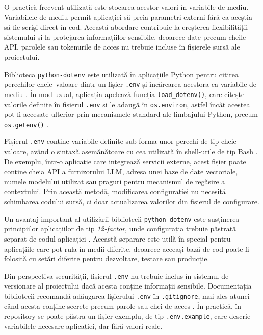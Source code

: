 \documentclass[12pt, a4paper, oneside, romanian]{teza-upb}
\begin{document}
O practică frecvent utilizată este stocarea acestor valori în variabile de mediu. Variabilele de mediu permit aplicației să preia parametri externi fără ca aceștia să fie scriși direct în cod. Această abordare contribuie la creșterea flexibilității sistemului și la protejarea informațiilor sensibile, deoarece date precum cheile API, parolele sau tokenurile de acces nu trebuie incluse în fișierele sursă ale proiectului.

Biblioteca \texttt{python-dotenv} este utilizată în aplicațiile Python pentru citirea perechilor cheie--valoare dintr-un fișier \texttt{.env} și încărcarea acestora ca variabile de mediu \cite{python_dotenv_doc}. În mod uzual, aplicația apelează funcția \texttt{load\_dotenv()}, care citește valorile definite în fișierul \texttt{.env} și le adaugă în \texttt{os.environ}, astfel încât acestea pot fi accesate ulterior prin mecanismele standard ale limbajului Python, precum \texttt{os.getenv()} \cite{python_dotenv_doc}.

Fișierul \texttt{.env} conține variabile definite sub forma unor perechi de tip cheie--valoare, având o sintaxă asemănătoare cu cea utilizată în shell-urile de tip Bash \cite{python_dotenv_doc}. De exemplu, într-o aplicație care integrează servicii externe, acest fișier poate conține cheia API a furnizorului LLM, adresa unei baze de date vectoriale, numele modelului utilizat sau praguri pentru mecanismul de regăsire a contextului. Prin această metodă, modificarea configurației nu necesită schimbarea codului sursă, ci doar actualizarea valorilor din fișierul de configurare.

Un avantaj important al utilizării bibliotecii \texttt{python-dotenv} este susținerea principiilor aplicațiilor de tip \textit{12-factor}, unde configurația trebuie păstrată separat de codul aplicației \cite{python_dotenv_doc}. Această separare este utilă în special pentru aplicațiile care pot rula în medii diferite, deoarece aceeași bază de cod poate fi folosită cu setări diferite pentru dezvoltare, testare sau producție.

Din perspectiva securității, fișierul \texttt{.env} nu trebuie inclus în sistemul de versionare al proiectului dacă acesta conține informații sensibile. Documentația bibliotecii recomandă adăugarea fișierului \texttt{.env} în \texttt{.gitignore}, mai ales atunci când acesta conține secrete precum parole sau chei de acces \cite{python_dotenv_doc}. În practică, în repository se poate păstra un fișier exemplu, de tip \texttt{.env.example}, care descrie variabilele necesare aplicației, dar fără valori reale.
\end{document}
